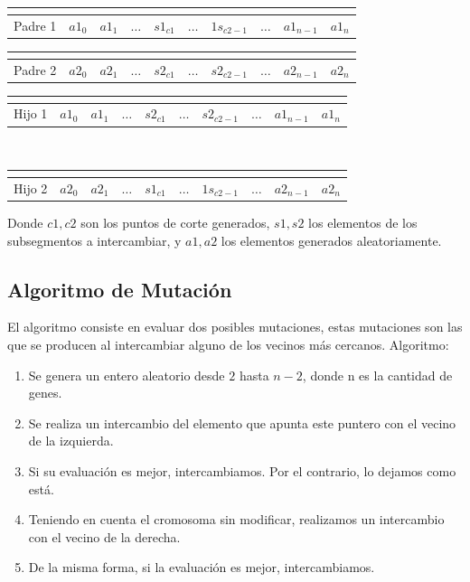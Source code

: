 \documentclass{article}
\def\MCe{\multicolumn{1}{c}{}}
\begin{document}
\begin{tabular}{|l|*9{c|}}
	\MCe \\\hline
	Padre 1 & $a1_0$ & $a1_1$ & $\dots$ & $s1_{c1}$ & $\dots$ & $1s_{c2-1}$ & $\dots$ & $a1_{n-1}$ & $a1_{n}$ \\\hline
\end{tabular}

\begin{tabular}{|l|*9{c|}}
	\MCe \\\hline
	Padre 2 & $a2_0$ & $a2_1$ & $\dots$ & $s2_{c1}$ & $\dots$ & $s2_{c2-1}$ & $\dots$ & $a2_{n-1}$ & $a2_{n}$ \\\hline
\end{tabular}
\bigskip

\begin{tabular}{|l|*9{c|}}
	\MCe \\\hline
	Hijo 1 & $a1_0$ & $a1_1$ & $\dots$ & $s2_{c1}$ & $\dots$ & $s2_{c2-1}$ & $\dots$ & $a1_{n-1}$ & $a1_{n}$ \\\hline
\end{tabular}

\\
\begin{tabular}{|l|*9{c|}}
	\MCe \\\hline
	Hijo 2 & $a2_0$ & $a2_1$ & $\dots$ & $s1_{c1}$ & $\dots$ & $1s_{c2-1}$ & $\dots$ & $a2_{n-1}$ & $a2_{n}$ \\\hline
\end{tabular}
\newline\newline
Donde $c1, c2$ son los puntos de corte generados, $s1, s2$ los elementos de los subsegmentos a intercambiar, y $a1, a2$ los elementos generados aleatoriamente.
\newpage
\subsection{Algoritmo de Mutación}
El algoritmo consiste en evaluar dos posibles mutaciones, estas mutaciones son las que se producen al intercambiar alguno de los vecinos más cercanos.
Algoritmo:
\begin{enumerate}
	\item Se genera un entero aleatorio desde $2$ hasta $n-2$, donde n es la cantidad de genes.
	\item Se realiza un intercambio del elemento que apunta este puntero con el vecino de la izquierda.
	\item Si su evaluación es mejor, intercambiamos. Por el contrario, lo dejamos como está.
	\item Teniendo en cuenta el cromosoma sin modificar, realizamos un intercambio con el vecino de la derecha.
	\item De la misma forma, si la evaluación es mejor, intercambiamos.
\end{enumerate}
\newline
\end{document}
